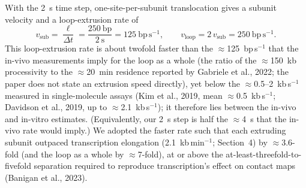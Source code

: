 \documentclass[11pt]{article}
\begin{document}
With the 2~s time step, one-site-per-subunit translocation gives a subunit velocity
and a loop-extrusion rate of
%
\begin{equation}
v_{\mathrm{sub}} = \frac{\ell}{\Delta t} = \frac{250\ \mathrm{bp}}{2\ \mathrm{s}}
= 125\ \mathrm{bp\,s^{-1}},
\qquad v_{\mathrm{loop}} = 2\,v_{\mathrm{sub}} = 250\ \mathrm{bp\,s^{-1}}.
\end{equation}
%
This loop-extrusion rate is about twofold faster than the $\approx$125~bp\,s$^{-1}$ that the
in-vivo measurements imply for the loop as a whole (the ratio of the $\approx$150~kb
processivity to the $\approx$20~min residence reported by Gabriele et al., 2022; the paper
does not state an extrusion speed directly), yet below the
$\approx$0.5--2~kb\,s$^{-1}$ measured in single-molecule assays (Kim et al., 2019, mean
$\approx$0.5~kb\,s$^{-1}$; Davidson et al., 2019, up to $\approx$2.1~kb\,s$^{-1}$); it
therefore lies between the in-vivo and in-vitro estimates. (Equivalently, our 2~s step is
half the $\approx$4~s that the in-vivo rate would imply.) We adopted the faster rate such
 that each extruding subunit outpaced transcription elongation (2.1~kb\,min$^{-1}$;
Section~4) by $\approx$3.6-fold (and the loop as a whole by $\approx$7-fold), at or
above the at-least-threefold-to-fivefold separation required to
reproduce transcription's effect on contact maps (Banigan et al., 2023).
\end{document}
